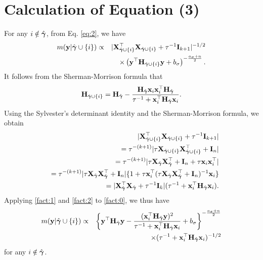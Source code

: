 \section{Calculation of Equation (3)}\label{app:1}
For any $i \notin \hat{{\boldsymbol \gamma}}$, from Eq. \eqref{eq:2}, we have
\begin{eqnarray}
\nonumber m({\bf y}|\hat{{\boldsymbol \gamma}}\cup\{i\})&\propto& |{\bf X}_{\hat{{\boldsymbol \gamma}}\cup\{i\} }^{{ \top}}{\bf X}_{\hat{{\boldsymbol \gamma}}\cup\{i\} }+\tau^{-1}{\bf I}_{k+1} |^{-1/2} \\
 \label{fact:0}&&\times \left({\bf y}^{{ \top}}{\bf H}_{\hat{{\boldsymbol \gamma}}\cup\{i\}}{\bf y}+b_{\sigma}\right)^{-\frac{a_{\sigma}+n}{2} }.
\end{eqnarray}
It follows from the Sherman-Morrison formula that
\begin{eqnarray}\label{fact:1}
{\bf H}_{\hat{{\boldsymbol \gamma}}\cup\{i\} }= {\bf H}_{\hat{{\boldsymbol \gamma}}}-\frac{{\bf H}_{\hat{{\boldsymbol \gamma}}}{\bf x}_i {\bf x}_i
	^{{ \top}}{\bf H}_{\hat{{\boldsymbol \gamma}}} } {\tau^{-1}+{\bf x}_i^{{ \top}}{\bf H}_{\hat{{\boldsymbol \gamma}}}{\bf x}_i}.
\end{eqnarray}
Using the Sylvester's determinant identity and the Sherman-Morrison formula, we obtain 
\begin{eqnarray}
	\nonumber &&|{\bf X}_{\hat{{\boldsymbol \gamma}}\cup\{i\} }^{{ \top}}{\bf X}_{\hat{{\boldsymbol \gamma}}\cup\{i\} }+\tau^{-1}{\bf I}_{k+1}   | \\
	\nonumber &&= \tau^{-(k+1)}|\tau {\bf X}_{\hat{{\boldsymbol \gamma}}\cup\{i\} }{\bf X}_{\hat{{\boldsymbol \gamma}}\cup\{i\} }^{{ \top}}+{\bf I}_n |\nonumber\\
	\nonumber &&= \tau^{-(k+1)}|\tau {\bf X}_{\hat{{\boldsymbol \gamma}}}{\bf X}_{\hat{{\boldsymbol \gamma}}}^{{ \top}}+{\bf I}_n+\tau {\bf x}_i {\bf x}_i^{{ \top}} |\nonumber\\
	\nonumber &&=  \tau^{-(k+1)} |\tau {\bf X}_{\hat{{\boldsymbol \gamma}}}{\bf X}_{\hat{{\boldsymbol \gamma}}}^{{ \top}}+{\bf I}_n| \{1+ \tau {\bf x}_i^{{ \top}}
	(\tau {\bf X}_{\hat{{\boldsymbol \gamma}}}{\bf X}_{\hat{{\boldsymbol \gamma}}}^{{ \top}}+{\bf I}_n)^{-1}{\bf x}_i\}\nonumber\\
	\label{fact:2} &&=| {\bf X}_{\hat{{\boldsymbol \gamma}}}^{{ \top}}{\bf X}_{\hat{{\boldsymbol \gamma}}}+\tau^{-1}{\bf I}_{k}| (\tau^{-1}+{\bf x}_i^{{ \top}}{\bf H}_{\hat{{\boldsymbol \gamma}}} {\bf x}_i).
\end{eqnarray}
Applying \eqref{fact:1} and \eqref{fact:2} to \eqref{fact:0}, we thus have
\begin{eqnarray*}
 m({\bf y}|\hat{{\boldsymbol \gamma}}\cup\{i\}) &\propto& \left\{{\bf y}^{{ \top}}{\bf H}_{\hat{{\boldsymbol \gamma}}}{\bf y}-\frac{(
 	{\bf x}_i^{{ \top}}{\bf H}_{\hat{{\boldsymbol \gamma}}}{\bf y})^2}{\tau^{-1}+{\bf x}_i^{{ \top}}{\bf H}_{\hat{{\boldsymbol \gamma}}} {\bf x}_i }+b_{\sigma}\right\}^
 {-\frac{a_{\sigma}+n}{2}}\\
 &&\times (\tau^{-1}+{\bf x}_i^{{ \top}}{\bf H}_{\hat{{\boldsymbol \gamma}}} {\bf x}_i)^{-1/2}
\end{eqnarray*}
for any $i \notin \hat{{\boldsymbol \gamma}}$. 

